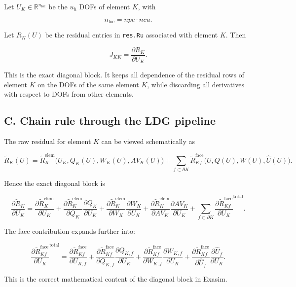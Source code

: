 \documentclass[11pt]{article}
\begin{document}
Let $U_K \in \mathbb{R}^{n_{\mathrm{loc}}}$ be the $u_h$ DOFs of element $K$,
with

\[
n_{\mathrm{loc}} = npe \cdot ncu.
\]

Let $R_K(U)$ be the residual entries in \texttt{res.Ru} associated with
element $K$. Then

\[
J_{KK} = \frac{\partial R_K}{\partial U_K}.
\]

This is the exact diagonal block. It keeps all dependence of the residual rows
of element $K$ on the DOFs of the same element $K$, while discarding all
derivatives with respect to DOFs from other elements.

\subsection*{C. Chain rule through the LDG pipeline}

The raw residual for element $K$ can be viewed schematically as

\[
\widetilde R_K(U)
=
\widetilde R^{\mathrm{elem}}_K\big(U_K, Q_K(U), W_K(U), AV_K(U)\big)
+
\sum_{f \subset \partial K}
\widetilde R^{\mathrm{face}}_{Kf}
\big(U, Q(U), W(U), \hat U(U)\big).
\]

Hence the exact diagonal block is

\[
\frac{\partial \widetilde R_K}{\partial U_K}
=
\frac{\partial \widetilde R^{\mathrm{elem}}_K}{\partial U_K}
+
\frac{\partial \widetilde R^{\mathrm{elem}}_K}{\partial Q_K}\frac{\partial Q_K}{\partial U_K}
+
\frac{\partial \widetilde R^{\mathrm{elem}}_K}{\partial W_K}\frac{\partial W_K}{\partial U_K}
+
\frac{\partial \widetilde R^{\mathrm{elem}}_K}{\partial AV_K}\frac{\partial AV_K}{\partial U_K}
+
\sum_{f \subset \partial K}
\frac{\partial \widetilde R^{\mathrm{face}}_{Kf}}{\partial U_K}^{\mathrm{total}}.
\]

The face contribution expands further into:

\[
\frac{\partial \widetilde R^{\mathrm{face}}_{Kf}}{\partial U_K}^{\mathrm{total}}
=
\frac{\partial \widetilde R^{\mathrm{face}}_{Kf}}{\partial U_{K,f}}
+
\frac{\partial \widetilde R^{\mathrm{face}}_{Kf}}{\partial Q_{K,f}}
\frac{\partial Q_{K,f}}{\partial U_K}
+
\frac{\partial \widetilde R^{\mathrm{face}}_{Kf}}{\partial W_{K,f}}
\frac{\partial W_{K,f}}{\partial U_K}
+
\frac{\partial \widetilde R^{\mathrm{face}}_{Kf}}{\partial \hat U_f}
\frac{\partial \hat U_f}{\partial U_K}.
\]

This is the correct mathematical content of the diagonal block in Exasim.
\end{document}
